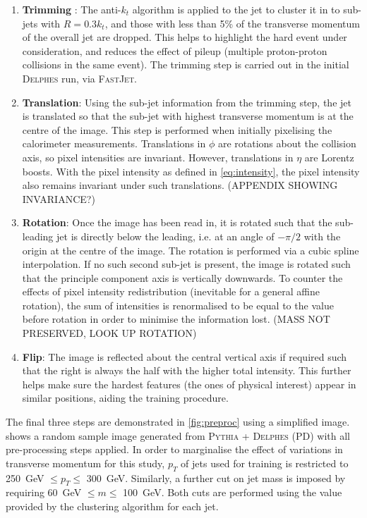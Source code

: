 \documentclass{report}
\newcommand{\pkg}[1]{\textsc{#1}}
\begin{document}
\begin{enumerate}
	\item \textbf{Trimming} \cite{trimming}: The anti-$k_t$ algorithm is applied to the jet to cluster it in to sub-jets with $R = 0.3 k_t$, and those with less than 5\% of the transverse momentum of the overall jet are dropped. This helps to highlight the hard event under consideration, and reduces the effect of pileup (multiple proton-proton collisions in the same event). The trimming step is carried out in the initial \pkg{Delphes} run, via \pkg{FastJet}.
	
	
	\item \textbf{Translation}: Using the sub-jet information from the trimming step, the jet is translated so that the sub-jet with highest transverse momentum is at the centre of the image. This step is performed when initially pixelising the calorimeter measurements. Translations in $\phi$ are rotations about the collision axis, so pixel intensities are invariant. However, translations in $\eta$ are Lorentz boosts. With the pixel intensity as defined in \cref{eq:intensity}, the pixel intensity also remains invariant under such translations. (APPENDIX SHOWING INVARIANCE?)
	
	\item \textbf{Rotation}: Once the image has been read in, it is rotated such that the sub-leading jet is directly below the leading, i.e. at an angle of $-\pi/2$ with the origin at the centre of the image. The rotation is performed via a cubic spline interpolation. If no such second sub-jet is present, the image is rotated such that the principle component axis is vertically downwards. To counter the effects of pixel intensity redistribution (inevitable for a general affine rotation), the sum of intensities is renormalised to be equal to the value before rotation in order to minimise the information lost. (MASS NOT PRESERVED, LOOK UP ROTATION)
	
	\item \textbf{Flip}:  The image is reflected about the central vertical axis if required such that the right is always the half with the higher total intensity. This further helps make sure the hardest features (the ones of physical interest) appear in similar positions, aiding the training procedure. 
	
\end{enumerate}

The final three steps are demonstrated in \cref{fig:preproc} using a simplified image.  shows a random sample image generated from \pkg{Pythia} + \pkg{Delphes} (PD) with all pre-processing steps applied. In order to marginalise the effect of variations in transverse momentum for this study, $p_T$ of jets used for training is restricted to \SI{250}{\giga\electronvolt} $\leq p_T \leq$ \SI{300}{\giga\electronvolt}. Similarly, a further cut on jet mass is imposed by requiring \SI{60}{\giga\electronvolt} $\leq m \leq$ \SI{100}{\giga\electronvolt}. Both cuts are performed using the value provided by the clustering algorithm for each jet.
\end{document}
